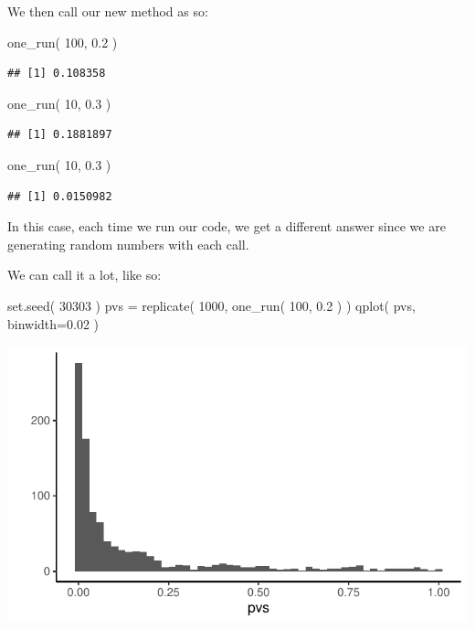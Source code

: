 \documentclass[
]{book}
\newenvironment{Shaded}{\begin{snugshade}}{\end{snugshade}}
\newcommand{\AttributeTok}[1]{\textcolor[rgb]{0.77,0.63,0.00}{#1}}
\newcommand{\DecValTok}[1]{\textcolor[rgb]{0.00,0.00,0.81}{#1}}
\newcommand{\FloatTok}[1]{\textcolor[rgb]{0.00,0.00,0.81}{#1}}
\newcommand{\FunctionTok}[1]{\textcolor[rgb]{0.00,0.00,0.00}{#1}}
\newcommand{\NormalTok}[1]{#1}
\newcommand{\OtherTok}[1]{\textcolor[rgb]{0.56,0.35,0.01}{#1}}
\begin{document}
We then call our new method as so:

\begin{Shaded}
\begin{Highlighting}[]
\FunctionTok{one\_run}\NormalTok{( }\DecValTok{100}\NormalTok{, }\FloatTok{0.2}\NormalTok{ )}
\end{Highlighting}
\end{Shaded}

\begin{verbatim}
## [1] 0.108358
\end{verbatim}

\begin{Shaded}
\begin{Highlighting}[]
\FunctionTok{one\_run}\NormalTok{( }\DecValTok{10}\NormalTok{, }\FloatTok{0.3}\NormalTok{ )}
\end{Highlighting}
\end{Shaded}

\begin{verbatim}
## [1] 0.1881897
\end{verbatim}

\begin{Shaded}
\begin{Highlighting}[]
\FunctionTok{one\_run}\NormalTok{( }\DecValTok{10}\NormalTok{, }\FloatTok{0.3}\NormalTok{ )}
\end{Highlighting}
\end{Shaded}

\begin{verbatim}
## [1] 0.0150982
\end{verbatim}

In this case, each time we run our code, we get a different answer since we are generating random numbers with each call.

We can call it a lot, like so:

\begin{Shaded}
\begin{Highlighting}[]
\FunctionTok{set.seed}\NormalTok{( }\DecValTok{30303}\NormalTok{ )}
\NormalTok{pvs }\OtherTok{=} \FunctionTok{replicate}\NormalTok{( }\DecValTok{1000}\NormalTok{, }\FunctionTok{one\_run}\NormalTok{( }\DecValTok{100}\NormalTok{, }\FloatTok{0.2}\NormalTok{ ) )}
\FunctionTok{qplot}\NormalTok{( pvs, }\AttributeTok{binwidth=}\FloatTok{0.02}\NormalTok{ )}
\end{Highlighting}
\end{Shaded}

\begin{center}\includegraphics[width=0.75\linewidth]{Designing-Simulations-in-R_files/figure-latex/pvalue_plot-1} \end{center}
\end{document}
